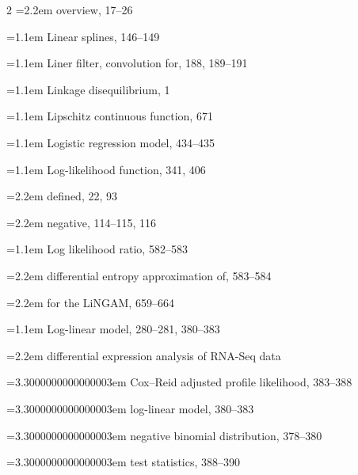\begin{multicols}{2}
\noindent\hangindent=2.2em \hspace*{1.1em}overview, 17--26\par
\noindent\hangindent=1.1em Linear splines, 146--149\par
\noindent\hangindent=1.1em Liner filter, convolution for, 188, 189--191\par
\noindent\hangindent=1.1em Linkage disequilibrium, 1\par
\noindent\hangindent=1.1em Lipschitz continuous function, 671\par
\noindent\hangindent=1.1em Logistic regression model, 434--435\par
\noindent\hangindent=1.1em Log-likelihood function, 341, 406\par
\noindent\hangindent=2.2em \hspace*{1.1em}defined, 22, 93\par
\noindent\hangindent=2.2em \hspace*{1.1em}negative, 114--115, 116\par
\noindent\hangindent=1.1em Log likelihood ratio, 582--583\par
\noindent\hangindent=2.2em \hspace*{1.1em}differential entropy approximation of, 583--584\par
\noindent\hangindent=2.2em \hspace*{1.1em}for the LiNGAM, 659--664\par
\noindent\hangindent=1.1em Log-linear model, 280--281, 380--383\par
\noindent\hangindent=2.2em \hspace*{1.1em}differential expression analysis of RNA-Seq data\par
\noindent\hangindent=3.3000000000000003em \hspace*{2.2em}Cox--Reid adjusted profile likelihood, 383--388\par
\noindent\hangindent=3.3000000000000003em \hspace*{2.2em}log-linear model, 380--383\par
\noindent\hangindent=3.3000000000000003em \hspace*{2.2em}negative binomial distribution, 378--380\par
\noindent\hangindent=3.3000000000000003em \hspace*{2.2em}test statistics, 388--390\par

\end{multicols}
